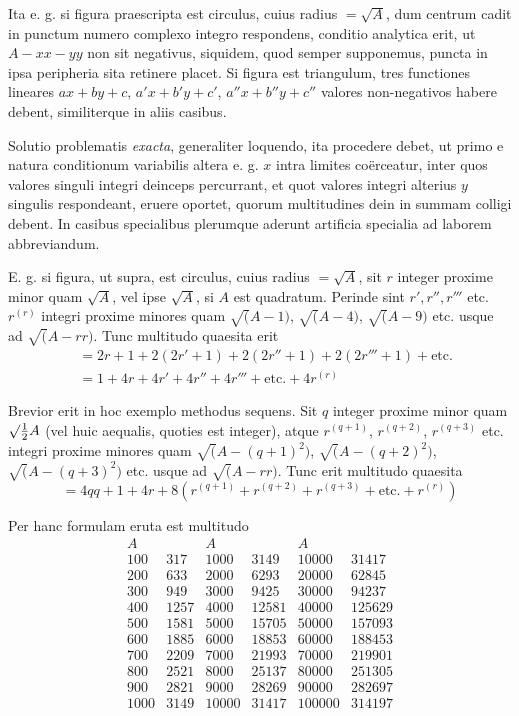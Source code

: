 Ita e. g. si figura praescripta est circulus, cuius radius $=\surd A$, dum centrum cadit in punctum numero complexo integro respondens, conditio analytica erit, ut $A-xx-yy$ non sit negativus, siquidem, quod semper supponemus, puncta in ipsa peripheria sita retinere placet. Si figura est triangulum, tres functiones lineares $ax+by+c$, $a'x+b'y+c'$, $a''x+b''y+c''$ valores non-negativos habere debent, similiterque in aliis casibus.

Solutio problematis \emph{exacta}, generaliter loquendo, ita procedere debet, ut primo e natura conditionum variabilis altera e. g. $x$ intra limites coërceatur, inter quos valores singuli integri deinceps percurrant, et quot valores integri alterius $y$ singulis respondeant, eruere oportet, quorum multitudines dein in summam colligi debent. In casibus specialibus plerumque aderunt artificia specialia ad laborem abbreviandum.

E. g. si figura, ut supra, est circulus, cuius radius $=\surd A$, sit $r$ integer proxime minor quam $\surd A$, vel ipse $\surd A$, si $A$ est quadratum. Perinde sint $r',r'',r'''$ etc. $r^{(r)}$ integri proxime minores quam $\surd(A-1)$, $\surd(A-4)$, $\surd(A-9)$ etc. usque ad $\surd(A-rr)$. Tunc multitudo quaesita erit
\[
\begin{aligned}
&=2r+1+2(2r'+1)+2(2r''+1)+2(2r'''+1)+\text{etc.}\\
&=1+4r+4r'+4r''+4r'''+\text{etc.}+4r^{(r)}
\end{aligned}
\]

Brevior erit in hoc exemplo methodus sequens. Sit $q$ integer proxime minor quam $\surd\tfrac12 A$ (vel huic aequalis, quoties est integer), atque $r^{(q+1)}$, $r^{(q+2)}$, $r^{(q+3)}$ etc. integri proxime minores quam $\surd(A-(q+1)^2)$, $\surd(A-(q+2)^2)$, $\surd(A-(q+3)^2)$ etc. usque ad $\surd(A-rr)$. Tunc erit multitudo quaesita
\[
=4qq+1+4r+8(r^{(q+1)}+r^{(q+2)}+r^{(q+3)}+\text{etc.}+r^{(r)})
\]

Per hanc formulam eruta est multitudo
\[
\begin{array}{r|r||r|r||r|r}
A&&A&&A&\\\hline
100&317&1000&3149&10000&31417\\
200&633&2000&6293&20000&62845\\
300&949&3000&9425&30000&94237\\
400&1257&4000&12581&40000&125629\\
500&1581&5000&15705&50000&157093\\
600&1885&6000&18853&60000&188453\\
700&2209&7000&21993&70000&219901\\
800&2521&8000&25137&80000&251305\\
900&2821&9000&28269&90000&282697\\
1000&3149&10000&31417&100000&314197
\end{array}
\]

